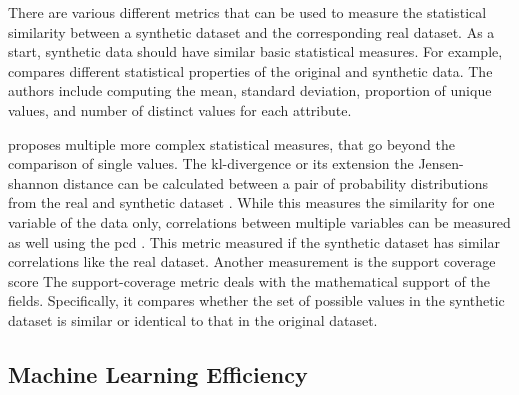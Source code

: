 There are various different metrics that can be used to measure the statistical similarity between a synthetic dataset and the corresponding real dataset.
As a start, synthetic data should have similar basic statistical measures.
For example, \cite{delcarmenrodriguez-hernandez2017DataGenCARSGeneratorSynthetic} compares different statistical properties of the original and synthetic data. 
The authors include computing the mean, standard deviation, proportion of unique values, and number of distinct values for each attribute.

\cite{goncalves2020GenerationEvaluationSynthetic} proposes multiple more complex statistical measures, that go beyond the comparison of single values.
The \gls{kl}-divergence or its extension the Jensen-shannon distance \cite{zhao2022CTABGANEnhancingTabular} can be calculated between a pair of probability distributions from the real and synthetic dataset \cite{goncalves2020GenerationEvaluationSynthetic, li2022TTSGANTransformerbasedTimeSeries}.
While this measures the similarity for one variable of the data only, correlations between multiple variables can be measured as well using the \gls{pcd} \cite{goncalves2020GenerationEvaluationSynthetic}.
This metric measured if the synthetic dataset has similar correlations like the real dataset.
Another measurement is the support coverage score \cite{goncalves2020GenerationEvaluationSynthetic}
The support-coverage metric deals with the mathematical support of the fields. 
Specifically, it compares whether the set of possible values in the synthetic dataset is similar or identical to that in the original dataset.

\subsection{Machine Learning Efficiency}
\label{ch:preliminaries-machineLearningEfficiency}

